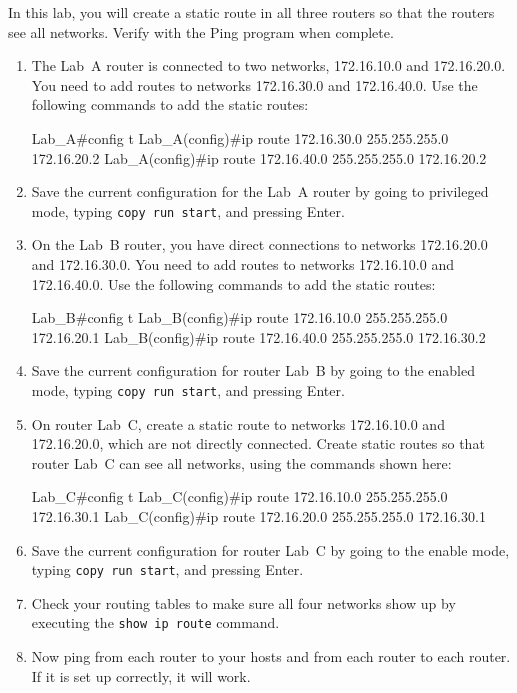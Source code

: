 In this lab, you will create a static route in all three routers so that
the routers see all networks. Verify with the Ping program when
complete.

\begin{enumerate}
\item
  The Lab~A router is connected to two networks, 172.16.10.0 and
  172.16.20.0. You need to add routes to networks 172.16.30.0 and
  172.16.40.0. Use the following commands to add the static routes:

\begin{cli}
Lab_A#config t
Lab_A(config)#ip route 172.16.30.0 255.255.255.0
  172.16.20.2
Lab_A(config)#ip route 172.16.40.0 255.255.255.0
  172.16.20.2
\end{cli}
\item
  Save the current configuration for the Lab~A router by going to
  privileged mode, typing \texttt{copy\ run\ start}, and pressing Enter.
\item
  On the Lab~B router, you have direct connections to networks
  172.16.20.0 and 172.16.30.0. You need to add routes to networks
  172.16.10.0 and 172.16.40.0. Use the following commands to add the
  static routes:

\begin{cli}
Lab_B#config t
Lab_B(config)#ip route 172.16.10.0 255.255.255.0
  172.16.20.1
Lab_B(config)#ip route 172.16.40.0 255.255.255.0
  172.16.30.2
\end{cli}
\item
  Save the current configuration for router Lab~B by going to the
  enabled mode, typing \texttt{copy\ run\ start}, and pressing Enter.
\item
  On router Lab~C, create a static route to networks 172.16.10.0 and
  172.16.20.0, which are not directly connected. Create static routes so
  that router Lab~C can see all networks, using the commands shown
  here:

\begin{cli}
Lab_C#config t
Lab_C(config)#ip route 172.16.10.0 255.255.255.0
  172.16.30.1
Lab_C(config)#ip route 172.16.20.0 255.255.255.0
  172.16.30.1
\end{cli}
\item
  Save the current configuration for router Lab~C by going to the
  enable mode, typing \texttt{copy\ run\ start}, and pressing Enter.
\item
  \protect\hypertarget{c09.xhtmlux5cux23Page_403}{}{}Check your routing
  tables to make sure all four networks show up by executing the
  \texttt{show\ ip\ route} command.
\item
  Now ping from each router to your hosts and from each router to each
  router. If it is set up correctly, it will work.
\end{enumerate}

